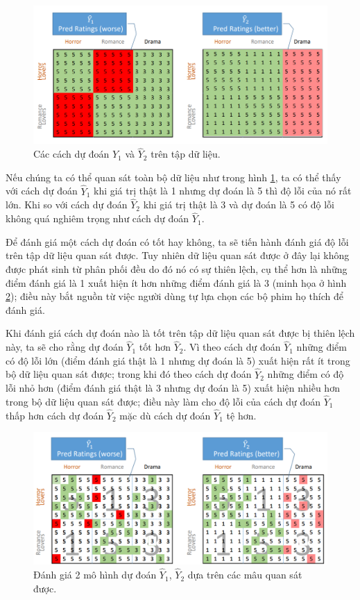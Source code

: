 \begin{figure}[ht]
    \centering
    \includegraphics[width=\textwidth]{images/Chapter1/example_bias_2.png}
    \caption{Các cách dự đoán $\hat{Y}_1$ và $\hat{Y}_2$ trên tập dữ liệu.}
    \label{fig:chap1_ex_2}
\end{figure}

Nếu chúng ta có thể quan sát toàn bộ dữ liệu như trong hình \ref{fig:chap1_ex_2}, ta có thể thấy với cách dự đoán $\hat{Y}_1$ khi giá trị thật là 1 nhưng dự đoán là 5 thì độ lỗi của nó rất lớn. Khi so với cách dự đoán $\hat{Y}_2$ khi giá trị thật là 3 và dự đoán là 5 có độ lỗi không quá nghiêm trọng như cách dự đoán $\hat{Y}_1$.

Để đánh giá một cách dự đoán có tốt hay không, ta sẽ tiến hành đánh giá độ lỗi trên tập dữ liệu quan sát được. Tuy nhiên dữ liệu quan sát được ở đây lại không được phát sinh từ phân phối đều do đó nó có sự thiên lệch, cụ thể hơn là những điểm đánh giá là 1 xuất hiện ít hơn những điểm đánh giá là 3 (minh họa ở hình \ref{fig:chap1_ex_3}); điều này bắt nguồn từ việc người dùng tự lựa chọn các bộ phim họ thích để đánh giá.

Khi đánh giá cách dự đoán nào là tốt trên tập dữ liệu quan sát được bị thiên lệch này, ta sẽ cho rằng dự đoán $\hat{Y}_1$ tốt hơn $\hat{Y}_2$. Vì theo cách dự đoán $\hat{Y}_1$ những điểm có độ lỗi lớn (điểm đánh giá thật là 1 nhưng dự đoán là 5) xuất hiện rất ít trong bộ dữ liệu quan sát được; trong khi đó theo cách dự đoán $\hat{Y}_2$ những điểm có độ lỗi nhỏ hơn (điểm đánh giá thật là 3 nhưng dự đoán là 5) xuất hiện nhiều hơn trong bộ dữ liệu quan sát được; điều này làm cho độ lỗi của cách dự đoán $\hat{Y}_1$ thấp hơn cách dự đoán $\hat{Y}_2$ mặc dù cách dự đoán $\hat{Y}_1$ tệ hơn. 

\begin{figure}[h]
    \centering
    \includegraphics[width=\textwidth]{images/Chapter1/example_bias_3.png}
    \caption{Đánh giá 2 mô hình dự đoán $\hat{Y}_1$, $\hat{Y}_2$ dựa trên các mâu quan sát được.}
    \label{fig:chap1_ex_3}
\end{figure}

